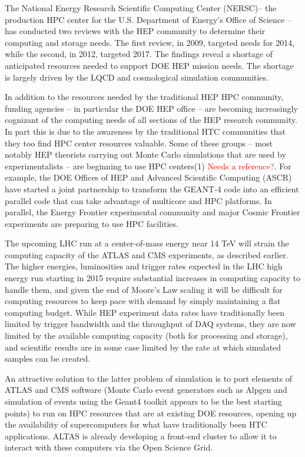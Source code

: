 The National Energy Research Scientific Computing Center (NERSC)-- the production HPC center for the U.S. Department of Energy's Office of Science -- has conducted two reviews with the HEP community to determine their computing and storage needs. The first review, in 2009, targeted needs for 2014, while the second, in 2012, targeted 2017.  The findings reveal a shortage of anticipated resources needed to support DOE HEP mission needs. 
The shortage is largely driven by the LQCD and cosmological simulation communities. 


In addition to the resources needed by the traditional HEP HPC community, funding agencies 
-- in particular the DOE HEP office -- are becoming increasingly cognizant of the computing 
needs of all sections of the HEP research community. In part this is due to the awareness 
by the traditional HTC communities that they too find HPC center resources valuable. 
Some of these groups -- most notably HEP theorists carrying out Monte Carlo simulations that 
are used by experimentalists -- are beginning to use HPC centers(1) \textcolor{red}{Needs a reference?}. 
For example, the DOE Offices of HEP and Advanced Scientific Computing (ASCR) have started a joint partnership to transform the GEANT-4 code into an efficient parallel code that can take advantage of multicore and HPC platforms. In parallel, the Energy Frontier experimental community and major Cosmic Frontier experiments are preparing to use HPC facilities.
 
The upcoming LHC run at a center-of-mass energy near 14 TeV will strain the computing capacity of the ATLAS and CMS experiments, as described earlier. The higher energies, luminosities and trigger rates expected in the LHC high energy run starting in 2015 require substantial increases in computing capacity to handle them, and given the end of Moore's Law scaling it will be difficult for computing resources to keep pace with demand by simply maintaining a flat computing budget.  While HEP experiment data rates have traditionally been limited by trigger bandwidth and the throughput of DAQ systems, they are now limited by the available computing capacity (both for processing and storage), and scientific results are in some case limited by the rate at which simulated samples can be created.

An attractive solution to the latter problem of simulation is to port elements of ATLAS and CMS software (Monte Carlo event generators such as Alpgen and simulation of events using the Geant4 toolkit appears to be the best starting points) to run on HPC resources that are at existing DOE resources, opening up the availability of supercomputers for what have traditionally been HTC applications.  ALTAS is already developing a front-end cluster to allow it to interact with these computers via the Open Science Grid.
 

